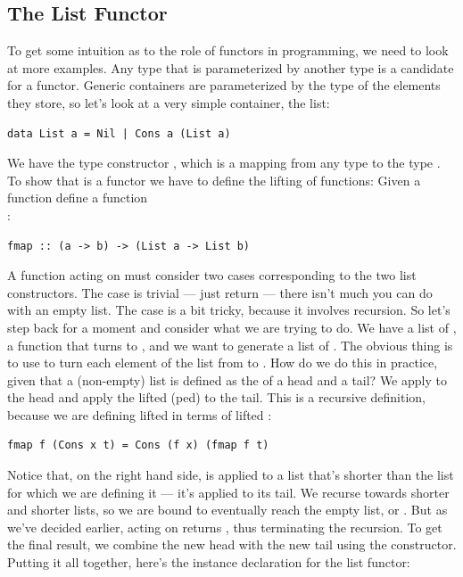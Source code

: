 \subsection{The List Functor}\label{the-list-functor}

To get some intuition as to the role of functors in programming, we need
to look at more examples. Any type that is parameterized by another type
is a candidate for a functor. Generic containers are parameterized by
the type of the elements they store, so let's look at a very simple
container, the list:

\begin{verbatim}
data List a = Nil | Cons a (List a)
\end{verbatim}
We have the type constructor , which is a mapping from any
type  to the type . To show that 
is a functor we have to define the lifting of functions: Given a
function  define a function\\
:

\begin{verbatim}
fmap :: (a -> b) -> (List a -> List b)
\end{verbatim}
A function acting on  must consider two cases
corresponding to the two list constructors. The  case is
trivial --- just return  --- there isn't much you can do
with an empty list. The  case is a bit tricky, because it
involves recursion. So let's step back for a moment and consider what we
are trying to do. We have a list of , a function 
that turns  to , and we want to generate a list of
. The obvious thing is to use  to turn each element
of the list from  to . How do we do this in
practice, given that a (non-empty) list is defined as the 
of a head and a tail? We apply  to the head and apply the
lifted (ped)  to the tail. This is a recursive
definition, because we are defining lifted  in terms of lifted
:

\begin{verbatim}
fmap f (Cons x t) = Cons (f x) (fmap f t)
\end{verbatim}
Notice that, on the right hand side,  is applied to a
list that's shorter than the list for which we are defining it --- it's
applied to its tail. We recurse towards shorter and shorter lists, so we
are bound to eventually reach the empty list, or . But as
we've decided earlier,  acting on  returns
, thus terminating the recursion. To get the final result,
we combine the new head  with the new tail
 using the  constructor. Putting it
all together, here's the instance declaration for the list functor:

